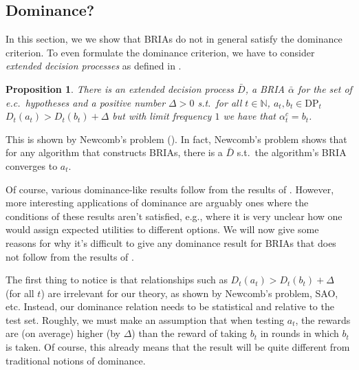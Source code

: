 \documentclass[submission,copyright,creativecommons]{eptcs}
\newtheorem{proposition}[theorem]{Proposition}
\newcommand{\DP}{\mathrm{DP}}
\begin{document}
\begin{extendedonlyblock}
\section{Dominance?}

In this section, we we show that BRIAs do not in general satisfy the dominance criterion. To even formulate the dominance criterion, we have to consider \textit{extended decision processes} as defined in .

\begin{proposition}
There is an extended decision process $\bar D$, a BRIA $\bar\alpha$ for the set of e.c.\ hypotheses and a positive number $\Delta>0$ s.t.\ for all $t\in \mathbb{N}$, $a_t,b_t \in \DP_t$ $D_t(a_t)>D_t(b_t)+\Delta$ but with limit frequency $1$ we have that $\alpha_t^c = b_t$.
\end{proposition}

This is shown by Newcomb's problem ().
In fact, Newcomb's problem shows that for any algorithm that constructs BRIAs, there is a $\bar D$ s.t.\ the algorithm's BRIA converges to $a_t$.

Of course, various dominance-like results follow from the results of . However, more interesting applications of dominance are arguably ones where the conditions of these results aren't satisfied, e.g., where it is very unclear how one would assign expected utilities to different options. We will now give some reasons for why it's difficult to give any dominance result for BRIAs that does not follow from the results of .

The first thing to notice is that relationships such as $D_t(a_t)>D_t(b_t)+\Delta$ (for all $t$) are irrelevant for our theory, as shown by Newcomb's problem, SAO, etc. Instead, our dominance relation needs to be statistical and relative to the test set. Roughly, we must make an assumption that when testing $a_t$, the rewards are (on average) higher (by $\Delta$) than the reward of taking $b_t$ in rounds in which $b_t$ is taken. Of course, this already means that the result will be quite different from traditional notions of dominance.

%


\end{extendedonlyblock}
\end{document}
